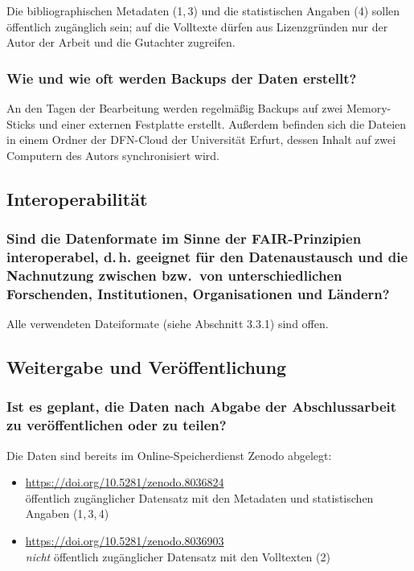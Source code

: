\documentclass[%
  11pt,
  DIV=16,
  a4paper,
  BCOR=15mm,
  twoside=on,
  bibliography=totoc,
  headings=normal,
  numbers=noendperiod,
]{scrartcl}
\begin{document}
Die bibliographischen Metadaten (1,\,3) und die statistischen Angaben (4) sollen öffentlich zugänglich sein;
auf die Volltexte dürfen aus Lizenzgründen nur der Autor der Arbeit und die Gutachter zugreifen.

\subsubsection{Wie und wie oft werden Backups der Daten erstellt?}

An den Tagen der Bearbeitung werden regelmäßig Backups auf zwei Memory-Sticks und einer externen Festplatte erstellt.
Außerdem befinden sich die Dateien in einem Ordner der DFN-Cloud der Universität Erfurt,
dessen Inhalt auf zwei Computern des Autors synchronisiert wird.

\subsection{Interoperabilität}

\subsubsection{Sind die Datenformate im Sinne der FAIR-Prinzipien interoperabel, \texorpdfstring{d.\,h.}{d.h.} geeignet für den Datenaustausch und die Nachnutzung zwischen bzw.\ von unterschiedlichen Forschenden, Institutionen, Organisationen und Ländern?}

Alle verwendeten Dateiformate (siehe Abschnitt 3.3.1) sind offen.

\subsection{Weitergabe und Veröffentlichung}

\subsubsection{Ist es geplant, die Daten nach Abgabe der Abschlussarbeit zu veröffentlichen oder zu teilen?}

Die Daten sind bereits im Online-Speicherdienst Zenodo abgelegt:
%
\begin{itemize}
  \item
    \url{https://doi.org/10.5281/zenodo.8036824} \\
    öffentlich zugänglicher Datensatz mit den Metadaten und statistischen Angaben (1,\,3,\,4)
  \item
    \url{https://doi.org/10.5281/zenodo.8036903} \\
    \emph{nicht} öffentlich zugänglicher Datensatz mit den Volltexten (2)
\end{itemize}
%
\end{document}
